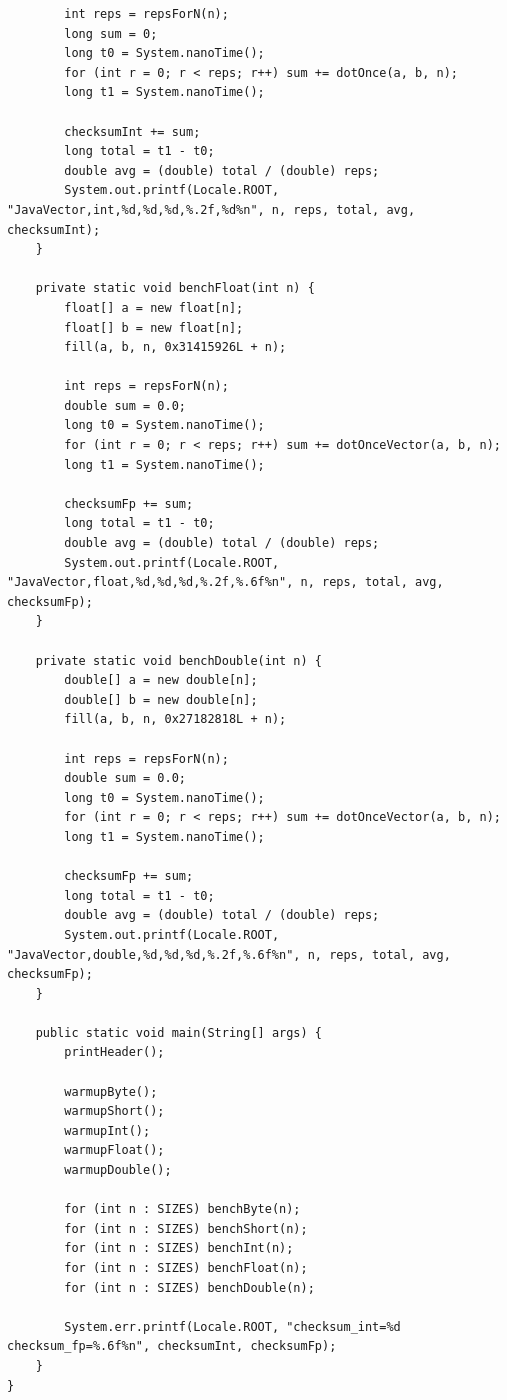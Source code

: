 \documentclass[12pt,fontset=none]{ctexart}
\begin{document}
\begin{verbatim}
        int reps = repsForN(n);
        long sum = 0;
        long t0 = System.nanoTime();
        for (int r = 0; r < reps; r++) sum += dotOnce(a, b, n);
        long t1 = System.nanoTime();

        checksumInt += sum;
        long total = t1 - t0;
        double avg = (double) total / (double) reps;
        System.out.printf(Locale.ROOT, "JavaVector,int,%d,%d,%d,%.2f,%d%n", n, reps, total, avg, checksumInt);
    }

    private static void benchFloat(int n) {
        float[] a = new float[n];
        float[] b = new float[n];
        fill(a, b, n, 0x31415926L + n);

        int reps = repsForN(n);
        double sum = 0.0;
        long t0 = System.nanoTime();
        for (int r = 0; r < reps; r++) sum += dotOnceVector(a, b, n);
        long t1 = System.nanoTime();

        checksumFp += sum;
        long total = t1 - t0;
        double avg = (double) total / (double) reps;
        System.out.printf(Locale.ROOT, "JavaVector,float,%d,%d,%d,%.2f,%.6f%n", n, reps, total, avg, checksumFp);
    }

    private static void benchDouble(int n) {
        double[] a = new double[n];
        double[] b = new double[n];
        fill(a, b, n, 0x27182818L + n);

        int reps = repsForN(n);
        double sum = 0.0;
        long t0 = System.nanoTime();
        for (int r = 0; r < reps; r++) sum += dotOnceVector(a, b, n);
        long t1 = System.nanoTime();

        checksumFp += sum;
        long total = t1 - t0;
        double avg = (double) total / (double) reps;
        System.out.printf(Locale.ROOT, "JavaVector,double,%d,%d,%d,%.2f,%.6f%n", n, reps, total, avg, checksumFp);
    }

    public static void main(String[] args) {
        printHeader();

        warmupByte();
        warmupShort();
        warmupInt();
        warmupFloat();
        warmupDouble();

        for (int n : SIZES) benchByte(n);
        for (int n : SIZES) benchShort(n);
        for (int n : SIZES) benchInt(n);
        for (int n : SIZES) benchFloat(n);
        for (int n : SIZES) benchDouble(n);

        System.err.printf(Locale.ROOT, "checksum_int=%d checksum_fp=%.6f%n", checksumInt, checksumFp);
    }
}
\end{verbatim}
\end{document}
